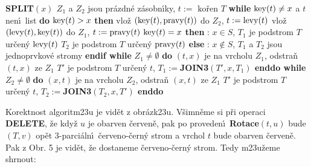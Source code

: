 {\bf SPLIT$(x)$\newline 
$Z_1$} a $Z_2$ jsou pr\'azdn\'e z\'asobn\'\i ky, $t:=\text{ ko\v ren }T$\newline 
{\bf while} $\operatorname{key}(t)\ne x$ a $t$ nen\'\i\ list {\bf do}\newline 
\phantom{---}{\bf if} $\operatorname{key}(t)>x$ {\bf then}\newline 
\phantom{------}vlo\v z $(\operatorname{key}(t),\operatorname{pravy}(t))$ do $Z_2$, $t:=\operatorname{levy}(t)$ \newline 
\phantom{---}{\bf else}\newline 
\phantom{------}vlo\v z $(\operatorname{levy}(t),\operatorname{key}(t))$ do $Z_1$, $t:=\operatorname{pravy}(t)$ \newline 
\phantom{---}{\bf endif\newline 
enddo \newline 
if} $\operatorname{key}(t)=x$ {\bf then}\newline 
\phantom{---}{\bf V\'ystup}: $x\in S$, $T_1$ je podstrom $T$ ur\v cen\'y $\operatorname{levy}(t)$ \newline 
\phantom{---}$T_2$ je podstrom $T$ ur\v cen\'y $\operatorname{pravy}(t)$ \newline 
{\bf else}\newline 
\phantom{---}{\bf V\'ystup}: $x\notin S$, $T_1$ a $T_2$ jsou jednoprvkov\'e stromy\newline 
{\bf endif \newline 
while} $Z_1\ne\emptyset$ {\bf do}\newline 
\phantom{---}$(t,x)$ je na vrcholu $Z_1$, odstra\v n $(t,x)$ ze $Z_1$ \newline 
\phantom{---}$T'$ je podstrom $T$ ur\v cen\'y $t$, $T_1:=${\bf JOIN3$(T',x,T_1
)$ \newline 
enddo\newline 
while} $Z_2\ne\emptyset$ {\bf do}\newline 
\phantom{---}$(x,t)$ je na vrcholu $Z_2$, odstra\v n $(x,t)$ ze $Z_1$ \newline 
\phantom{---}$T'$ je podstrom $T$ ur\v cen\'y $t$, $T_2:=${\bf JOIN3$(T_2,x,T'
)$ \newline 
enddo}
\medskip

\flushpar Korektnost algoritm\accent23u je vid\v et z 
obr\'azk\accent23u. V\v simn\v eme si p\v ri ope\-raci {\bf DELETE}, \v ze kdy\v z $
u$ je 
obarven \v cerven\v e, pak po proveden\'\i\ {\bf Rotace$(t,u)$} bude $
(T,v)$ op\v et 
3-parci\'aln\'\i\ \v cerveno-\v cern\'y strom a vrchol $t$ bude obarven \v cerven\v e.  
Pak z Obr.  5 je vid\v et, \v ze dostaneme \v cerveno-\v cern\'y 
strom. Tedy m\accent23u\v zeme shrnout:


